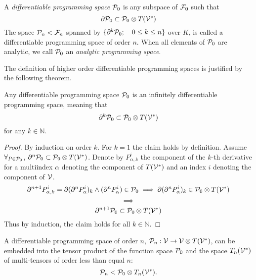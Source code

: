  
 \begin{definition}\label{def:dP}
  A \emph{differentiable programming space} $\mathcal{P}_0$ is any subspace of $\mathcal{F}_0$ such that
  \begin{equation}\label{eq:P}
  \partial\mathcal{P}_0\subset\mathcal{P}_0\otimes T(\mathcal{V}^*)
\end{equation}
The space $\mathcal{P}_n<\mathcal{F}_n$ spanned by $\{\partial^k\mathcal{P}_0;\quad 0\le k\le n\}$ over $K$, is
called a differentiable programming space of order $n$. When all elements of
$\mathcal{P}_0$ are analytic, we call $\mathcal{P}_0$ an \emph{analytic programming space}. 
 \end{definition}
The definition of higher order differentiable programming spaces is justified by the following theorem. 
\begin{theorem}\label{izr:P}
  Any differentiable programming space $\mathcal{P}_0$ is an
  infinitely differentiable programming space, meaning that
  \begin{equation}\label{eq:P_n}
      \partial^k\mathcal{P}_0\subset\mathcal{P}_0\otimes T(\mathcal{V}^*)
    \end{equation}
for any $k\in\mathbb{N}$.
\end{theorem}
\begin{proof} By induction on order $k$. For $k=1$ the claim holds by definition. Assume  $\forall_{P\in\mathcal{P}_0}$,
  $\partial^n\mathcal{P}_0\subset\mathcal{P}_0\otimes T(\mathcal{V}^*)$. Denote by $P_{\alpha,k}^i$ the
  component of the $k$-th derivative for a multiindex $\alpha$  denoting the
  component of $T(\mathcal{V}^*)$ and an index $i$ denoting the component of $\mathcal{V}$.
  \begin{equation}\label{eq:inductionStep}
\partial^{n+1}P_{\alpha,k}^i=\partial(\partial^n P^i_\alpha)_k\land(\partial^n P^i_\alpha)\in\mathcal{P}_0\implies \partial(\partial^n P^i_\alpha)_k\in \mathcal{P}_0\otimes T(\mathcal{V}^*)
  \end{equation}
  $$\implies$$
  $$\partial^{n+1}\mathcal{P}_0\subset\mathcal{P}_0\otimes T(\mathcal{V}^*)$$
Thus by induction, the claim holds for all $k\in \mathbb{N}$. 
\end{proof}



 \begin{corollary}\label{izr:P_n}
  A differentiable programming space of order $n$, $\mathcal{P}_n:\mathcal{V}\to \mathcal{V}\otimes
  T(\mathcal{V}^*)$, can be embedded into the tensor 
  product of the function space $\mathcal{P}_0$ and the space $T_n(\mathcal{V}^*)$ of
  multi-tensors of order less than equal $n$:
  \begin{equation}
    \label{eq:D_p_embed}
    \mathcal{P}_n<\mathcal{P}_0\otimes T_n(\mathcal{V}^*).
  \end{equation}
 \end{corollary}
 
